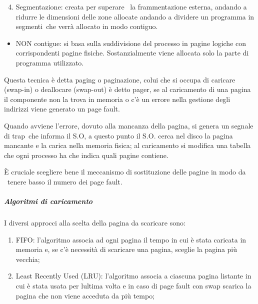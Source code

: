 \documentclass[
]{article}
\providecommand{\tightlist}{%
  \setlength{\itemsep}{0pt}\setlength{\parskip}{0pt}}
\begin{document}
{}

\begin{enumerate}
\setcounter{enumi}{3}
\tightlist
\item
  {Segmentazione}{: creata per superare ~la frammentazione esterna,
  andando a ridurre le dimensioni delle zone allocate andando a dividere
  un programma in }{segmenti}{~che verrà allocato in modo contiguo.}
\end{enumerate}

{}

\begin{itemize}
\tightlist
\item
  {NON contigue}{: si basa sulla suddivisione del processo in pagine
  logiche con corrispondenti pagine fisiche. Sostanzialmente viene
  allocata solo la parte di programma utilizzato.}
\end{itemize}

{Questa tecnica è detta paging o paginazione, colui che si occupa di
caricare (}{swap-in}{) o deallocare (}{swap-out}{) è detto pager, se al
caricamento di una pagina il componente non la trova in memoria o c'è un
errore nella gestione degli indirizzi viene generato un page fault.}

{Quando avviene l'errore, dovuto alla mancanza della pagina, si genera
un segnale di }{trap}{~che informa il S.O, a questo punto il S.O. cerca
nel disco la pagina mancante e la carica nella memoria fisica; al
caricamento si modifica una tabella che ogni processo ha che indica
quali pagine contiene.}

{È cruciale scegliere bene il meccanismo di sostituzione delle pagine in
modo da ~tenere basso il numero dei page fault.}

{}

\subparagraph{\texorpdfstring{{Algoritmi di
caricamento}}{Algoritmi di caricamento}}\label{h.whntklshcew2}

{I diversi approcci alla scelta della pagina da scaricare sono:}

{}

\begin{enumerate}
\tightlist
\item
  {FIFO: l'algoritmo associa ad ogni pagina il tempo in cui è stata
  caricata in memoria e, se c'è necessità di scaricare una pagina,
  sceglie la pagina più vecchia;}
\end{enumerate}

{}

\begin{enumerate}
\setcounter{enumi}{1}
\tightlist
\item
  {Least Recently Used (LRU): l'algoritmo associa a ciascuna pagina
  l\textquotesingle istante in cui è stata usata per
  l\textquotesingle ultima volta e in caso di page fault con swap
  scarica la pagina che non viene acceduta da più tempo;}
\end{enumerate}
\end{document}
